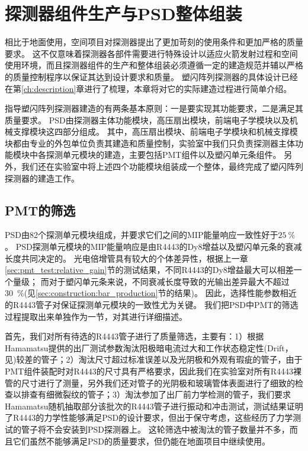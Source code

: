 \chapter{探测器组件生产与PSD整体组装}
\label{ch:construction}
相比于地面使用，空间项目对探测器提出了更加苛刻的使用条件和更加严格的质量要求。
这不仅意味着探测器各部件需要进行特殊设计以适应火箭发射过程和空间使用环境，而且探测器组件的生产和整体组装必须遵循一定的建造规范并辅以严格的质量控制程序以保证其达到设计要求和质量。
塑闪阵列探测器的具体设计已经在第\ref{ch:description}章进行了梳理，本章将对它的实际建造过程进行简单介绍。

指导塑闪阵列探测器建造的有两条基本原则：一是要实现其功能要求，二是满足其质量要求。
PSD由探测器主体功能模块，高压扇出模块，前端电子学模块以及机械支撑模块这四部分组成。
其中，高压扇出模块、前端电子学模块和机械支撑模块都由专业的外包单位负责其建造和质量控制，实验室中我们只负责探测器主体功能模块中各探测单元模块的建造，主要包括PMT组件以及塑闪单元条组件。
另外，我们还在实验室中将上述四个功能模块组装成一个整体，最终完成了塑闪阵列探测器的建造工作。

\section{PMT的筛选}
\label{sec:construction:pmt_selection}
PSD由82个探测单元模块组成，并要求它们之间的MIP能量响应一致性好于$\SI{25}{\percent}$。
PSD探测单元模块的MIP能量响应是由R4443的Dy8增益以及塑闪单元条的衰减长度共同决定的。
光电倍增管具有较大的个体差异性，根据上一章\ref{sec:pmt_test:relative_gain}节的测试结果，不同R4443的Dy8增益最大可以相差一个量级；
而对于塑闪单元条来说，不同衰减长度导致的光输出差异最大不超过\SI{30}{\percent}(见\ref{sec:construction:bar_production}节的结果)。
因此，选择性能参数相近的R4443管子对保证探测单元模块的一致性尤为关键。
我们把PSD中PMT的筛选过程提取出来单独作为一节，对其进行详细描述。

首先，我们对所有待选的R4443管子进行了质量筛选，主要有：1）根据Hamamatsu提供的出厂测试参数淘汰阳极暗电流过大和工作状态稳定性(Drift，见\parencite{hamamatsu})较差的管子；2）淘汰尺寸超过标准误差以及光阴极和外观有瑕疵的管子，由于PMT组件装配时对R4443的尺寸具有严格要求，因此我们在实验室对所有R4443裸管的尺寸进行了测量，另外我们还对管子的光阴极和玻璃管体表面进行了细致的检查以排查有细微裂纹的管子；3）淘汰参加了出厂前力学检测的管子，我们要求Hamamatsu随机抽取部分该批次的R4443管子进行振动和冲击测试，测试结果证明了R4443的力学性能够满足PSD的设计要求，但出于保守考虑，这些经历了力学测试的管子将不会安装到PSD探测器上。
这轮筛选中被淘汰的管子数量并不多，而且它们虽然不能够满足PSD的质量要求，但仍能在地面项目中继续使用。

